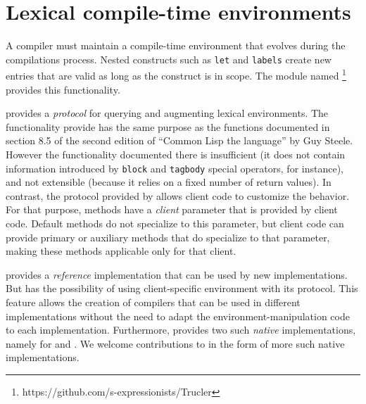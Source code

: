 \chapter{Lexical compile-time environments}

A \commonlisp{} compiler must maintain a compile-time environment that
evolves during the compilations process.  Nested constructs such as
\texttt{let} and \texttt{labels} create new entries that are valid as
long as the construct is in scope. The module named \trucler{}%
\footnote{https://github.com/s-expressionists/Trucler} provides this
functionality.

\trucler{} provides a \clos{} \emph{protocol} for querying and
augmenting lexical environments.  The functionality provide has the
same purpose as the functions documented in section 8.5 of the second
edition of ``Common Lisp the language'' by Guy Steele.  However the
functionality documented there is insufficient (it does not contain
information introduced by \texttt{block} and \texttt{tagbody} special
operators, for instance), and not extensible (because it relies on a
fixed number of return values).  In contrast, the protocol provided by
\trucler{} allows client code to customize the behavior.  For that
purpose, \trucler{} methods have a \emph{client} parameter that is
provided by client code.  Default \trucler{} methods do not specialize
to this parameter, but client code can provide primary or auxiliary
methods that do specialize to that parameter, making these methods
applicable only for that client.

\trucler{} provides a \emph{reference} implementation that can be used
by new \commonlisp{} implementations.  But \trucler{} has the
possibility of using client-specific environment with its protocol.
This feature allows the creation of compilers that can be used in
different \commonlisp{} implementations without the need to adapt the
environment-manipulation code to each implementation.  Furthermore,
\trucler{} provides two such \emph{native} implementations, namely for
\sbcl{} and \ccl{}.  We welcome contributions to \trucler{} in the
form of more such native implementations.

